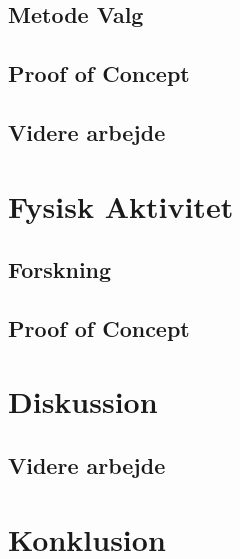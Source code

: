 \section{Metode Valg}

\section{Proof of Concept}

\section{Videre arbejde}



\chapter{Fysisk Aktivitet}

\section{Forskning}

\section{Proof of Concept}


\chapter{Diskussion}
\section{Videre arbejde}

\chapter{Konklusion}



\label{bib:mybiblio}

\appendix

